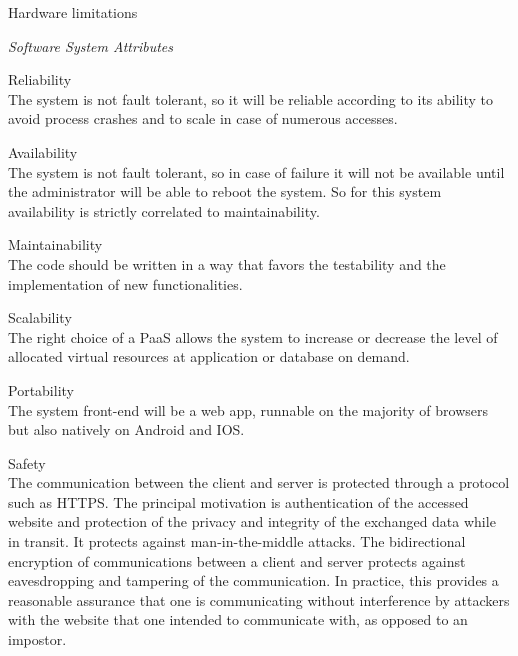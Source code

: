 \documentclass{article}
\begin{document}
\begin{legal}
\begin{legal}
\begin{legal}
			\item Hardware limitations\\
			\end{legal}
    		\item \textit{Software System Attributes }\\
		\begin{legal}\bfseries
			\item Reliability\\
			{\normalfont The system is not fault tolerant, so it will be reliable according to its ability to avoid process crashes and to scale in case of numerous accesses.}
			\\
			\item Availability\\
			{\normalfont The system is not fault tolerant, so in case of failure it will not be available until the administrator will be able to reboot the system. So for this system availability is strictly correlated to maintainability.}
			\\
			\item Maintainability\\
			{\normalfont The code should be written in a way that favors the testability and the implementation of new functionalities.}
			\\
			\item Scalability\\
			{\normalfont The right choice of a PaaS allows the system to increase or decrease the level of allocated virtual resources at application or database on demand.}
			\\
			\item Portability\\
			{\normalfont The system front-end will be a web app, runnable on the majority of browsers but also natively on Android and IOS.}
			\\
			\item Safety\\
			{\normalfont The communication between the client and server is protected through a protocol such as HTTPS. The principal motivation is authentication of the accessed website and protection of the privacy and integrity of the exchanged data while in transit. It protects against man-in-the-middle attacks. The bidirectional encryption of communications between a client and server protects against eavesdropping and tampering of the communication. In practice, this provides a reasonable assurance that one is communicating without interference by attackers with the website that one intended to communicate with, as opposed to an impostor. 			}

\end{legal}
\end{legal}
\end{legal}
\end{document}
